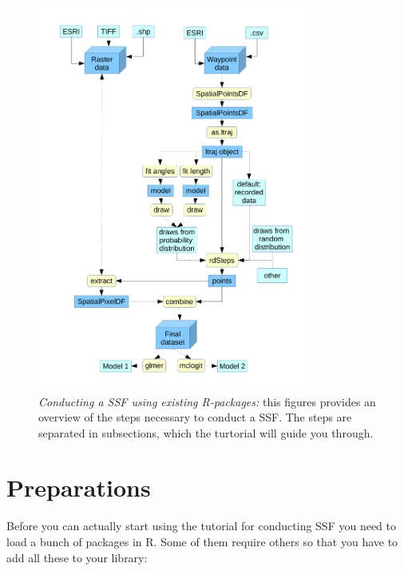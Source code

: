 \documentclass[11pt, a4paper]{article} %
\begin{document}
\begin{figure} %
\captionsetup{width=0.8\textwidth}
\centering
\includegraphics[width=0.8\textwidth]{Flowchart.pdf} %
\caption{\emph{Conducting a SSF using existing R-packages:} this figures provides an overview of the steps necessary to conduct a SSF. The steps are separated in subsections, which the turtorial will guide you through.}
\label{fig:Flowchart}
\end{figure}




\section{Preparations}
Before you can actually start using the tutorial for conducting SSF you need to load a bunch of packages in R. Some of them require others so that you have to add all these to your library:
\end{document}

